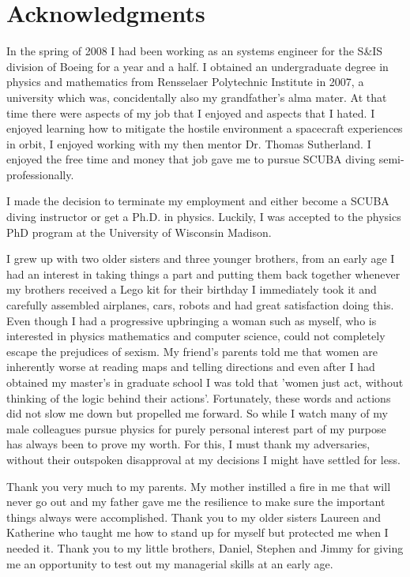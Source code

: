 \section{Acknowledgments}
In the spring of 2008 I had been working as an systems engineer for the S&IS division
of Boeing %
for a year and a half. 
I obtained an undergraduate degree in physics and mathematics 
from Rensselaer Polytechnic Institute in 2007, a university which was, concidentally also
my grandfather's alma mater. 
At that time there were aspects
of my job that I enjoyed and aspects that I hated. I enjoyed learning how to mitigate
the hostile environment a spacecraft experiences in orbit, I enjoyed working
with my then mentor Dr. Thomas Sutherland. I enjoyed the free time
and money that job gave me to pursue SCUBA diving semi-professionally. 

I made the decision
to terminate my employment and either become a SCUBA diving instructor or
get a Ph.D. in physics. Luckily, I was accepted to the physics PhD program at the University of Wisconsin
Madison. 

I grew up with two older sisters and three younger brothers, from an early age I had
an interest in taking things a part and putting them back together
whenever my brothers received a Lego kit for their birthday I
immediately took it and carefully assembled airplanes, cars, robots and had great
satisfaction doing this. Even though
I had a progressive upbringing a woman such as myself, who is interested in physics
mathematics and computer science, could not completely 
escape the prejudices of sexism. My friend's parents
told me that women are inherently worse at reading maps and telling 
directions and
even after I had obtained my master's in graduate school 
I was told that 'women just act, without thinking 
of the logic behind their actions'. Fortunately, these words and actions did not 
slow me down but propelled me forward. So while I watch many of my 
male colleagues pursue physics for purely personal interest part of my
purpose has always been to prove my worth. For this, I must thank my adversaries, 
without their outspoken disapproval at my decisions I might have 
settled for less. 

Thank you very much to my parents. My mother instilled a fire in me that will never 
go out and my father gave me the resilience to make sure the important things
always were accomplished. 
Thank you to my older sisters Laureen and Katherine who taught me how to stand up 
for myself but protected me when I needed it. Thank you to my little brothers, Daniel, Stephen
and Jimmy for giving me an opportunity to test out my managerial skills at an early age.

